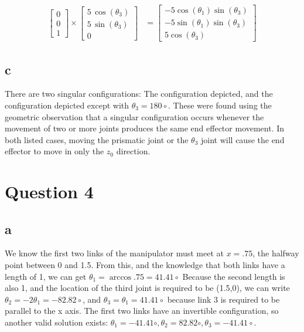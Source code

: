 \documentclass[11pt]{article}
\begin{document}
\begin{align*}
\begin{bmatrix}0 \\ 0 \\ 1 \end{bmatrix}
\times
\begin{bmatrix}
5\,\cos\left(\theta _{3}\right)\\ 5\,\sin\left(\theta _{3}\right)\\ 0 
\end{bmatrix}
    &=
\begin{bmatrix}
-5\cos\left(\theta_{1}\right)\sin\left(\theta_{3}\right)\\ -5\sin\left(\theta_{1}\right)\sin\left(\theta _{3}\right)\\ 5\cos\left(\theta_{3}\right)
\end{bmatrix}
\end{align*}

\subsection*{c}
There are two singular configurations: The configuration depicted, and the configuration depicted 
except with $\theta_3=180\circ$.
These were found using the geometric observation that a singular configuration occurs whenever the 
movement of two or more joints produces the same end effector movement. In both listed cases,
moving the prismatic joint or the $\theta_3$ joint will cause the end effector to move in only the 
$z_0$ direction.



\section*{Question 4}
\subsection*{a}
We know the first two links of the manipulator must meet at $x=.75$, the halfway point between 0 and 1.5.
From this, and the knowledge that both links have a length of 1, we can get $\theta_1=\arccos{.75}=41.41\circ$
Because the second length is also 1, and the location of the third joint is required to be (1.5,0), we
can write $\theta_2=-2\theta_1=-82.82\circ$, and $\theta_3=\theta_1=41.41\circ$ because link 3 is 
required to be parallel to the x axis. The first two links have an invertible configuration, so 
another valid solution exists: $\theta_1=-41.41\circ, \theta_2=82.82\circ, \theta_3=-41.41\circ$.
\end{document}

